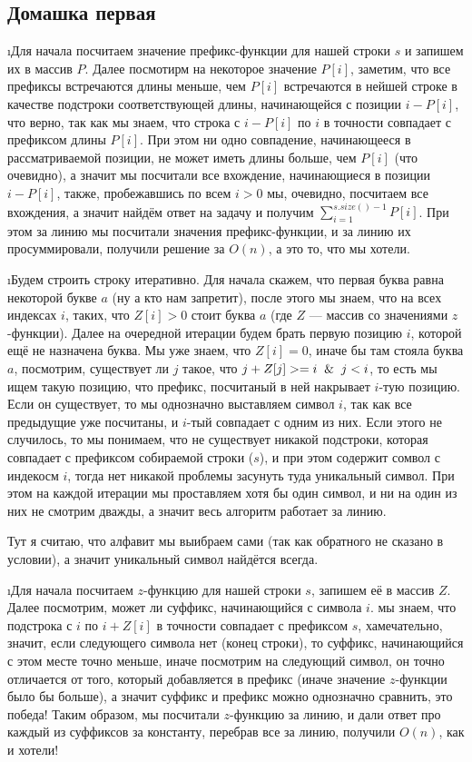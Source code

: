 \subsection{Домашка первая}

\i Для начала посчитаем значение префикс-функции для нашей строки $s$ и запишем их в массив $P$. Далее посмотирм на некоторое значение $P[i]$, заметим, что все префиксы 
встречаются длины меньше, чем $P[i]$ встречаются в нейшей строке в качестве подстроки соответствующей длины, начинающейся с позиции $i - P[i]$, что верно,
так как мы знаем, что строка с $i - P[i]$ по $i$ в точности совпадает с префиксом длины $P[i]$. При этом ни одно совпадение, начинающееся в рассматриваемой 
позиции, не может иметь длины больше, чем $P[i]$ (что очевидно), а значит мы посчитали все вхождение, начинающиеся в позиции $i - P[i]$, также, пробежавшись по всем $i > 0$ 
мы, очевидно, посчитаем все вхождения, а значит найдём ответ на задачу и получим $\sum_{i=1}^{s.size()-1} P[i]$. При этом за линию мы посчитали значения
префикс-функции, и за линию их просуммировали, получили решение за $O(n)$, а это то, что мы хотели.

\i Будем строить строку итеративно. Для начала скажем, что первая буква равна некоторой букве $a$ (ну а кто нам запретит), после этого мы знаем, что на всех
индексах $i$, таких, что $Z[i] > 0$ стоит буква $a$ (где $Z$ --- массив со значениями $z$-функции). Далее на очередной итерации будем брать первую позицию
$i$, которой ещё не назначена буква. Мы уже знаем, что $Z[i] = 0$, иначе бы там стояла буква $a$, посмотрим, существует ли $j$ такое, что $j + Z[j] >= i \And 
j < i$, то есть мы ищем такую позицию, что префикс, посчитаный в ней накрывает $i$-тую позицию. Если он существует, то мы однозначно выставляем символ $i$, 
так как все предыдущие уже посчитаны, и $i$-тый совпадает с одним из них. Если этого не случилось, то мы понимаем, что не существует никакой подстроки, 
которая совпадает с префиксом собираемой строки ($s$), и при этом содержит сомвол с индекосм $i$, тогда нет никакой проблемы засунуть туда уникальный символ.
При этом на каждой итерации мы проставляем хотя бы один символ, и ни на один из них не смотрим дважды, а значит весь алгоритм работает за линию.
\begin{remark*}
    Тут я считаю, что алфавит мы выибраем сами (так как обратного не сказано в условии), а значит уникальный символ найдётся всегда.
\end{remark*}

\i Для начала посчитаем $z$-функцию для нашей строки $s$, запишем её в массив $Z$. Далее посмотрим, может ли суффикс, начинающийся с символа $i$. мы знаем, что
подстрока с $i$ по $i + Z[i]$ в точности совпадает с префиксом $s$, хамечательно, значит, если следующего символа нет (конец строки), то суффикс, начинающийся 
с этом месте точно меньше, иначе посмотрим на следующий символ, он точно отличается от того, который добавляется в префикс (иначе значение $z$-функции было бы 
больше), а значит суффикс и префикс можно однозначно сравнить, это победа! Таким образом, мы посчитали $z$-функцию за линию, и дали ответ про каждый из суффиксов
за константу, перебрав все за линию, получили $O(n)$, как и хотели!

